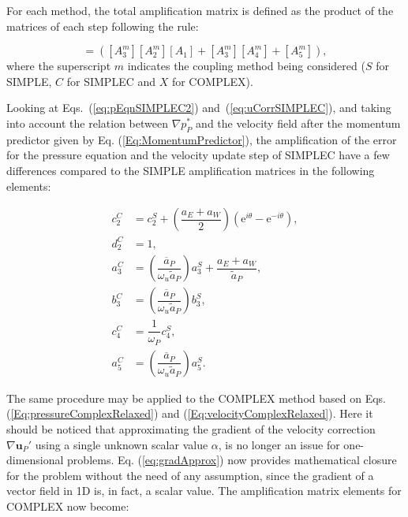 \documentclass[final,3p,times,11pt,onecolumn]{myElsarticle}
\numberwithin{equation}{section}
\begin{document}
For each method, the total amplification matrix is defined as the product of the matrices of each step following the rule:

\begin{equation}
[A^m] = ([A^m_3] [A^m_2] [A_1] + [A^m_3] [A^m_4] + [A^m_5]),
\end{equation}
where the superscript $m$ indicates the coupling method being considered ($S$ for SIMPLE, $C$ for SIMPLEC and $X$ for COMPLEX).

Looking at Eqs.~(\ref{eq:pEqnSIMPLEC2}) and~(\ref{eq:uCorrSIMPLEC}), and taking into account the relation between $\nabla p_P^*$ and the velocity field after the momentum predictor given by Eq. (\ref{Eq:MomentumPredictor}), the amplification of the error for the pressure equation and the velocity update step of SIMPLEC have a few differences compared to the SIMPLE amplification matrices in the following elements:

\begin{equation}
\begin{split}
     c^C_2 &= c_2^S + \left(\dfrac{a_E + a_W}{2}\right) (\text{e}^{i    \theta} - \text{e}^{-i \theta}), \\
     d^C_2 &= 1, \\
     a^C_3 &= \left(\dfrac{\overline{a}_P}{\omega_u \tilde{a}_P}\right) a_3^S + \dfrac{a_E+a_W}{\tilde{a}_P}, \\
     b^C_3 &= \left(\dfrac{\overline{a}_P}{\omega_u \tilde{a}_P}\right) b_3^S, \\ 
     c^C_4 &= \dfrac{1}{\omega_P} c^S_4, \\
     a^C_5 &= \left(\dfrac{\overline{a}_P}{\omega_u \tilde{a}_P}\right) a^S_5. 
\end{split}
\end{equation}

The same procedure may be applied to the COMPLEX method based on Eqs. (\ref{Eq:pressureComplexRelaxed}) and (\ref{Eq:velocityComplexRelaxed}). Here it should be noticed that approximating the gradient of the velocity correction $\nabla \boldsymbol{u}_P'$ using a single unknown scalar value $\alpha$, is no longer an issue for one-dimensional problems. Eq. (\ref{eq:gradApprox}) now provides mathematical closure for the problem without the need of any assumption, since the gradient of a vector field in 1D is, in fact, a scalar value. The amplification matrix elements for COMPLEX now become:
\end{document}
